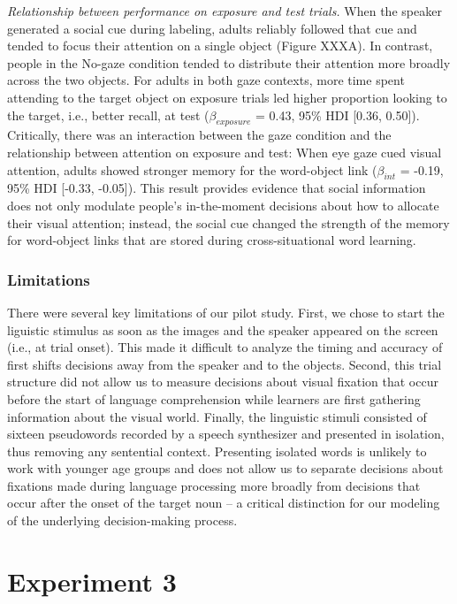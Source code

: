 \documentclass[man,floatsintext]{apa6}
\begin{document}
\emph{Relationship between performance on exposure and test trials.}
When the speaker generated a social cue during labeling, adults reliably
followed that cue and tended to focus their attention on a single object
(Figure XXXA). In contrast, people in the No-gaze condition tended to
distribute their attention more broadly across the two objects. For
adults in both gaze contexts, more time spent attending to the target
object on exposure trials led higher proportion looking to the target,
i.e., better recall, at test (\(\beta_{exposure}\) = 0.43, 95\% HDI
{[}0.36, 0.50{]}). Critically, there was an interaction between the gaze
condition and the relationship between attention on exposure and test:
When eye gaze cued visual attention, adults showed stronger memory for
the word-object link (\(\beta_{int}\) = -0.19, 95\% HDI {[}-0.33,
-0.05{]}). This result provides evidence that social information does
not only modulate people's in-the-moment decisions about how to allocate
their visual attention; instead, the social cue changed the strength of
the memory for word-object links that are stored during
cross-situational word learning.

\subsubsection{Limitations}\label{limitations}

There were several key limitations of our pilot study. First, we chose
to start the liguistic stimulus as soon as the images and the speaker
appeared on the screen (i.e., at trial onset). This made it difficult to
analyze the timing and accuracy of first shifts decisions away from the
speaker and to the objects. Second, this trial structure did not allow
us to measure decisions about visual fixation that occur before the
start of language comprehension while learners are first gathering
information about the visual world. Finally, the linguistic stimuli
consisted of sixteen pseudowords recorded by a speech synthesizer and
presented in isolation, thus removing any sentential context. Presenting
isolated words is unlikely to work with younger age groups and does not
allow us to separate decisions about fixations made during language
processing more broadly from decisions that occur after the onset of the
target noun -- a critical distinction for our modeling of the underlying
decision-making process.

\section{Experiment 3}\label{experiment-3}
\end{document}
